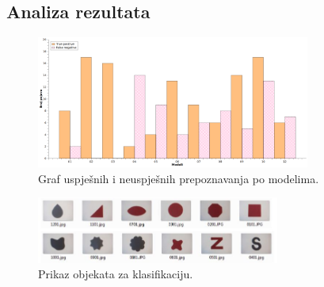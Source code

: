 \documentclass{beamer}
\begin{document}
\subsection{Analiza rezultata}
\begin{frame}
\begin{figure}[htb]
\begin{center}
\includegraphics[width=9cm]{resources/graf.png}
\end{center}
\caption{Graf uspješnih i neuspješnih prepoznavanja po modelima.} 
\label{fig:graf}
\end{figure}

\begin{figure}[htb]
\begin{center}
\includegraphics[width=8cm]{resources/baza.png}
\end{center}
\caption{Prikaz objekata za klasifikaciju.} 
\label{fig:baza}
\end{figure}
\end{frame}
\end{document}
